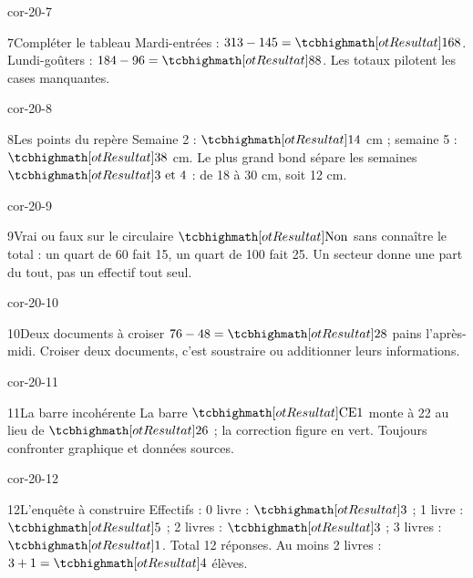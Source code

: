 \begin{blocLivre}{cor-20-7}\begin{corrige}{7}{Compléter le tableau}
Mardi-entrées : $313-145=\res{168}$. Lundi-goûters : $184-96=\res{88}$. Les totaux pilotent les cases manquantes.
\end{corrige}\end{blocLivre}
\begin{blocLivre}{cor-20-8}\begin{corrige}{8}{Les points du repère}
Semaine 2 : $\res{14}$ cm ; semaine 5 : $\res{38}$ cm. Le plus grand bond sépare les semaines $\res{3\text{ et }4}$ : de 18 à 30 cm, soit 12 cm.
\label{fig-cor-20-8}
\end{corrige}\end{blocLivre}
\begin{blocLivre}{cor-20-9}\begin{corrige}{9}{Vrai ou faux sur le circulaire}
$\res{\text{Non}}$ sans connaître le total : un quart de 60 fait 15, un quart de 100 fait 25. Un secteur donne une part du tout, pas un effectif tout seul.
\end{corrige}\end{blocLivre}
\begin{blocLivre}{cor-20-10}\begin{corrige}{10}{Deux documents à croiser}
$76-48=\res{28}$ pains l’après-midi. Croiser deux documents, c’est soustraire ou additionner leurs informations.
\label{fig-cor-20-10}
\end{corrige}\end{blocLivre}
\begin{blocLivre}{cor-20-11}\begin{corrige}{11}{La barre incohérente}
La barre $\res{\text{CE1}}$ monte à 22 au lieu de $\res{26}$ ; la correction figure en vert. Toujours confronter graphique et données sources.
\label{fig-cor-20-11}
\end{corrige}\end{blocLivre}
\begin{blocLivre}{cor-20-12}\begin{corrige}{12}{L’enquête à construire}
Effectifs : 0 livre : $\res3$ ; 1 livre : $\res5$ ; 2 livres : $\res3$ ; 3 livres : $\res1$. Total 12 réponses. Au moins 2 livres : $3+1=\res4$ élèves.
\end{corrige}\end{blocLivre}
